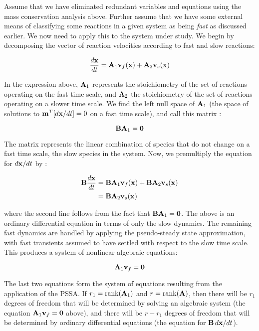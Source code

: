 Assume that we have eliminated redundant variables and equations
using the mass conservation analysis above.  Further assume that
we have some external means of classifying some reactions in a
given system as being \emph{fast} as discussed earlier.  We now
need to apply this to the system under study.  We begin by
decomposing the vector of reaction velocities \vb according to
fast and slow reactions:
\begin{linenomath}
\begin{equation*}
  \dfrac{d\mathbf{x}}{dt} = \mathbf{A}_1 \mathbf{v}_f(\mathbf{x}) + \mathbf{A}_2 \mathbf{v}_s(\mathbf{x})
\end{equation*}
\end{linenomath}
In the expression above, $\mathbf{A}_1$ represents the stoichiometry
of the set of reactions operating on the fast time scale, and
$\mathbf{A}_2$ the stoichiometry of the set of reactions operating on
a slower time scale.  We find the left null space of $\mathbf{A}_1$
(\ie the space of solutions to $\mathbf{m}^T[d\mathbf{x}/dt] = 0$ on a
fast time scale), and call this matrix \Bb:
\begin{linenomath}
\begin{equation*}
  \mathbf{B} \mathbf{A}_1 = \mathbf{0}
\end{equation*}
\end{linenomath}
The matrix \Bb represents the linear combination of species that
do not change on a fast time scale, \ie the slow species in the
system.  Now, we premultiply the equation for $d\mathbf{x}/dt$ by \Bb:
\begin{linenomath}
\begin{align*}
  \mathbf{B} \dfrac{d\mathbf{x}}{dt} &= \mathbf{B} \mathbf{A}_1 \mathbf{v}_f(\mathbf{x}) 
                               + \mathbf{B} \mathbf{A}_2 \mathbf{v}_s(\mathbf{x}) \\
                             &= \mathbf{B} \mathbf{A}_2 \mathbf{v}_s(\mathbf{x})
\end{align*}
\end{linenomath}
where the second line follows from the fact that $\mathbf{B} \mathbf{A}_1
= \mathbf{0}$.  The above is an ordinary differential equation in
terms of only the slow dynamics.  The remaining fast dynamics are
handled by applying the pseudo-steady state approximation, with
fast transients assumed to have settled with respect to the slow
time scale.  This produces a system of nonlinear algebraic
equations:
\begin{linenomath}
\begin{equation*}
  \mathbf{A}_1 \mathbf{v}_f = \mathbf{0}
\end{equation*}
\end{linenomath}
The last two equations form the system of equations resulting from
the application of the PSSA.  If $r_1 =
\operatorname{rank}(\mathbf{A}_1)$ and $r =
\operatorname{rank}(\mathbf{A})$, then there will be $r_1$ degrees of
freedom that will be determined by solving an algebraic system
(the equation $\mathbf{A}_1 \mathbf{v}_f = \mathbf{0}$ above), and there
will be $r - r_1$ degrees of freedom that will be determined by
ordinary differential equations (the equation for $\mathbf{B}\,
d\mathbf{x}/dt$).

